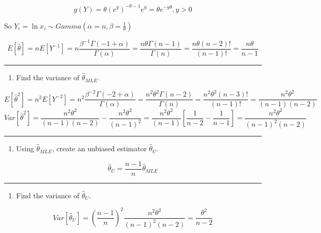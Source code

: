 \documentclass[12pt,]{article}
\providecommand{\tightlist}{%
  \setlength{\itemsep}{0pt}\setlength{\parskip}{0pt}}
\begin{document}
\[g(Y)=\theta(e^y)^{-\theta-1}e^y=\theta e^{-y\theta}, y>0\]

So \(Y_i=\ln x_i\sim Gamma(\alpha=n,\beta=\frac1{\theta})\)

\[E[\hat\theta]=nE[Y^{-1}]=n\frac{\beta^{-1}\Gamma(-1+\alpha)}{\Gamma(\alpha)}=\frac{n\theta\Gamma(n-1)}{\Gamma(n)}=\frac{n\theta(n-2)!}{(n-1)!}=\frac{n\theta}{n-1}\]

\begin{center}\rule{0.5\linewidth}{\linethickness}\end{center}

\begin{enumerate}
\def\labelenumi{\alph{enumi}.}
\setcounter{enumi}{2}
\tightlist
\item
  \textcolor[rgb]{0.5,0.5,0.5}{Find the variance of $\hat\theta_{MLE}$.}
\end{enumerate}

\[E[\hat\theta^2]=n^2E[Y^{-2}]=n^2\frac{\beta^{-2}\Gamma(-2+\alpha)}{\Gamma(\alpha)}=\frac{n^2\theta^2\Gamma(n-2)}{\Gamma(n)}=\frac{n^2\theta^2(n-3)!}{(n-1)!}=\frac{n^2\theta^2}{(n-1)(n-2)}\]
\[Var[\hat\theta^2]=\frac{n^2\theta^2}{(n-1)(n-2)}-\frac{n^2\theta^2}{(n-1)^2}=\frac{n^2\theta^2}{(n-1)}[\frac1{n-2}-\frac1{n-1}]=\frac{n^2\theta^2}{(n-1)^2(n-2)}\]

\begin{center}\rule{0.5\linewidth}{\linethickness}\end{center}

\begin{enumerate}
\def\labelenumi{\alph{enumi}.}
\setcounter{enumi}{3}
\tightlist
\item
  \textcolor[rgb]{0.5,0.5,0.5}{Using $\hat\theta_{MLE}$, create an unbiased estimator $\hat\theta_{U}$.}
\end{enumerate}

\[\hat\theta_{U}=\frac{n-1}{n}\hat\theta_{MLE}\]

\begin{center}\rule{0.5\linewidth}{\linethickness}\end{center}

\begin{enumerate}
\def\labelenumi{\alph{enumi}.}
\setcounter{enumi}{4}
\tightlist
\item
  \textcolor[rgb]{0.5,0.5,0.5}{Find the variance of $\hat\theta_{U}$.}
\end{enumerate}

\[Var[\hat\theta_{U}]=(\frac{n-1}{n})^2\frac{n^2\theta^2}{(n-1)^2(n-2)}=\frac{\theta^2}{n-2}\]
\end{document}
